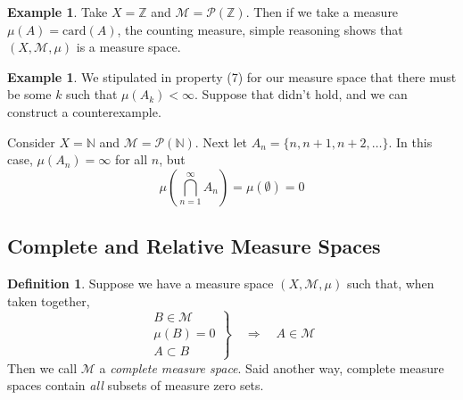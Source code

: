 \documentclass[12pt]{article}
\theoremstyle{plain}
\theoremstyle{definition}
\newtheorem{defn}[thm]{Definition}
\newtheorem{ex}[thm]{Example}
\theoremstyle{remark}
\begin{document}
\begin{ex}
Take $X=\mathbb{Z}$ and $\mathscr{M}=\mathscr{P}(\mathbb{Z})$. Then if we take a measure $\mu(A) = \text{card}\left( A \right)$, the counting measure, simple reasoning shows that $(X,\mathscr{M},\mu)$ is a measure space.
\end{ex}

\begin{ex}
We stipulated in property (7) for our measure space that there must be some $k$ such that $\mu(A_k)<\infty$. Suppose that didn't hold, and we can construct a counterexample. 
    
    Consider $X = \mathbb{N}$ and $\mathscr{M} =\mathscr{P}(\mathbb{N})$. Next let $A_n = \{n, n+1, n+2, \ldots\}$. In this case, $\mu(A_n) = \infty$ for all $n$, but
    \[ 
        \mu\left(\bigcap^\infty_{n=1} A_n\right) = 
        \mu(\emptyset) = 0
    \]
\end{ex}


\subsection{Complete and Relative Measure Spaces}

\begin{defn}
Suppose we have a measure space $(X,\mathscr{M},\mu)$ such that, when taken together,
\[
    \left.
    \begin{array}{r}
        B\in\mathscr{M} \\
        \mu(B) = 0\\
        A\subset B
    \end{array} \right\}
    \quad \Rightarrow\quad
    A\in\mathscr{M}
\]
Then we call $\mathscr{M}$ a \emph{complete measure space}. Said another
way, complete measure spaces contain \emph{all} subsets of measure zero
sets.
\end{defn}
\end{document}
